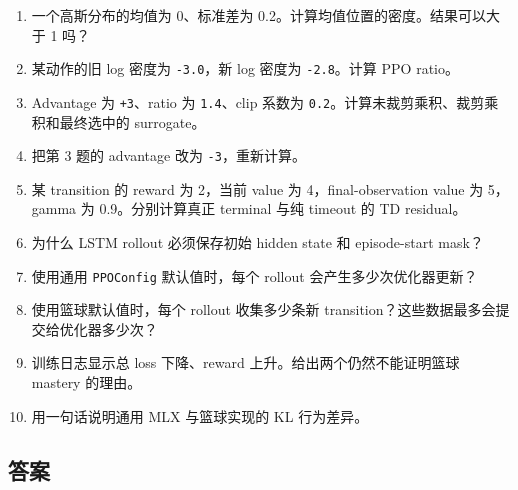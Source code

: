\documentclass[
  chinese,
  11pt,
  letterpaper,
]{article}
\providecommand{\tightlist}{%
  \setlength{\itemsep}{0pt}\setlength{\parskip}{0pt}}
\begin{document}
\begin{enumerate}
\def\labelenumi{\arabic{enumi}.}
\tightlist
\item
  一个高斯分布的均值为 0、标准差为 0.2。计算均值位置的密度。结果可以大于
  1 吗？
\item
  某动作的旧 log 密度为 \texttt{-3.0}，新 log 密度为 \texttt{-2.8}。计算
  PPO ratio。
\item
  Advantage 为 \texttt{+3}、ratio 为 \texttt{1.4}、clip 系数为
  \texttt{0.2}。计算未裁剪乘积、裁剪乘积和最终选中的 surrogate。
\item
  把第 3 题的 advantage 改为 \texttt{-3}，重新计算。
\item
  某 transition 的 reward 为 2，当前 value 为 4，final-observation value
  为 5，gamma 为 0.9。分别计算真正 terminal 与纯 timeout 的 TD
  residual。
\item
  为什么 LSTM rollout 必须保存初始 hidden state 和 episode-start mask？
\item
  使用通用 \texttt{PPOConfig} 默认值时，每个 rollout
  会产生多少次优化器更新？
\item
  使用篮球默认值时，每个 rollout 收集多少条新
  transition？这些数据最多会提交给优化器多少次？
\item
  训练日志显示总 loss 下降、reward 上升。给出两个仍然不能证明篮球
  mastery 的理由。
\item
  用一句话说明通用 MLX 与篮球实现的 KL 行为差异。
\end{enumerate}

\subsection{答案}\label{ux7b54ux6848}
\end{document}
